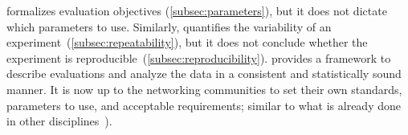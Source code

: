 \triscale formalizes evaluation objectives (\cref{subsec:parameters}), but it does not dictate which parameters to use.
Similarly, \triscale quantifies the variability of an experiment~(\cref{subsec:repeatability}), but it does not conclude whether the experiment is reproducible~(\cref{subsec:reproducibility}).
\triscale provides a framework to describe evaluations and analyze the data in a consistent and statistically sound manner. It is now up to the networking communities to set their own standards, parameters to use, and acceptable requirements; similar to what is already done in other disciplines~\cite{gallen14minimumreq}).
